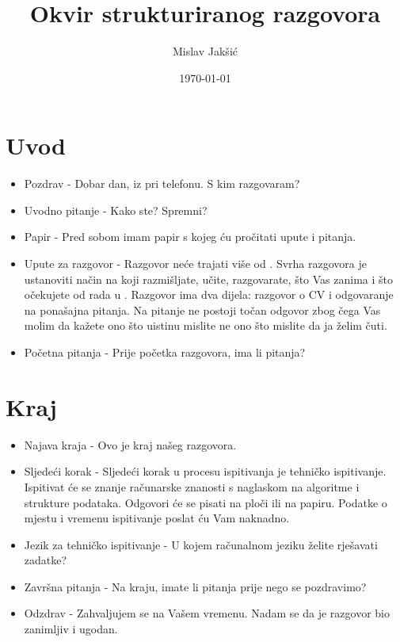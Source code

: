 \documentclass{article}
\title{Okvir strukturiranog razgovora}
\author{Mislav Jakšić}
\date{\today}
\begin{document}
\maketitle



\section{Uvod}

\begin{itemize}
  \item Pozdrav - Dobar dan,  iz  pri telefonu. S kim razgovaram?
  \item Uvodno pitanje - Kako ste? Spremni?
  \item Papir - Pred sobom imam papir s kojeg ću pročitati upute i pitanja.
  \item Upute za razgovor - Razgovor neće trajati više od . Svrha razgovora je ustanoviti način na koji razmišljate, učite, razgovarate, što Vas zanima i što očekujete od rada u . Razgovor ima dva dijela: razgovor o CV i odgovaranje na ponašajna pitanja. Na pitanje ne postoji točan odgovor zbog čega Vas molim da kažete ono što uistinu mislite ne ono što mislite da ja želim čuti.
  \item Početna pitanja - Prije početka razgovora, ima li pitanja?
\end{itemize}



\newpage
\section{Kraj}

\begin{itemize}
  \item Najava kraja - Ovo je kraj našeg razgovora.
  \item Sljedeći korak - Sljedeći korak u procesu ispitivanja je tehničko ispitivanje. Ispitivat će se znanje računarske znanosti s naglaskom na algoritme i strukture podataka. Odgovori će se pisati na ploči ili na papiru. Podatke o mjestu i vremenu ispitivanje poslat ću Vam naknadno.
  \item Jezik za tehničko ispitivanje - U kojem računalnom jeziku želite rješavati zadatke?
  \item Završna pitanja - Na kraju, imate li pitanja prije nego se pozdravimo?
  \item Odzdrav - Zahvaljujem se na Vašem vremenu. Nadam se da je razgovor bio zanimljiv i ugodan.
\end{itemize}
\end{document}
